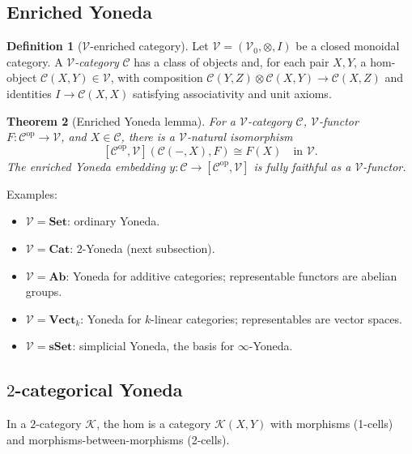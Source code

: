 \documentclass[12pt]{article}
\newtheorem{theorem}{Theorem}[section]
\theoremstyle{definition}
\newtheorem{definition}[theorem]{Definition}
\theoremstyle{remark}
\begin{document}
\subsection{Enriched Yoneda}

\begin{definition}[$\mathcal{V}$-enriched category]
\label{def:enriched-cat}
Let $\mathcal{V} = (\mathcal{V}_0, \otimes, I)$ be a closed monoidal category. A \emph{$\mathcal{V}$-category} $\mathcal{C}$ has a class of objects and, for each pair $X, Y$, a hom-object $\mathcal{C}(X, Y) \in \mathcal{V}$, with composition $\mathcal{C}(Y, Z) \otimes \mathcal{C}(X, Y) \to \mathcal{C}(X, Z)$ and identities $I \to \mathcal{C}(X, X)$ satisfying associativity and unit axioms.
\end{definition}

\begin{theorem}[Enriched Yoneda lemma]
\label{thm:enriched-yoneda}
For a $\mathcal{V}$-category $\mathcal{C}$, $\mathcal{V}$-functor $F\colon \mathcal{C}^{\mathrm{op}} \to \mathcal{V}$, and $X \in \mathcal{C}$, there is a $\mathcal{V}$-natural isomorphism
\[
[\mathcal{C}^{\mathrm{op}}, \mathcal{V}](\mathcal{C}(-, X), F) \cong F(X) \quad \text{in $\mathcal{V}$.}
\]
The enriched Yoneda embedding $y\colon \mathcal{C} \to [\mathcal{C}^{\mathrm{op}}, \mathcal{V}]$ is fully faithful as a $\mathcal{V}$-functor.
\end{theorem}

Examples:
\begin{itemize}
\item $\mathcal{V} = \mathbf{Set}$: ordinary Yoneda.
\item $\mathcal{V} = \mathbf{Cat}$: $2$-Yoneda (next subsection).
\item $\mathcal{V} = \mathbf{Ab}$: Yoneda for additive categories; representable functors are abelian groups.
\item $\mathcal{V} = \mathbf{Vect}_k$: Yoneda for $k$-linear categories; representables are vector spaces.
\item $\mathcal{V} = \mathbf{sSet}$: simplicial Yoneda, the basis for $\infty$-Yoneda.
\end{itemize}

\subsection{\texorpdfstring{$2$-categorical}{2-categorical} Yoneda}

In a $2$-category $\mathcal{K}$, the hom is a category $\mathcal{K}(X, Y)$ with morphisms (1-cells) and morphisms-between-morphisms (2-cells).
\end{document}
